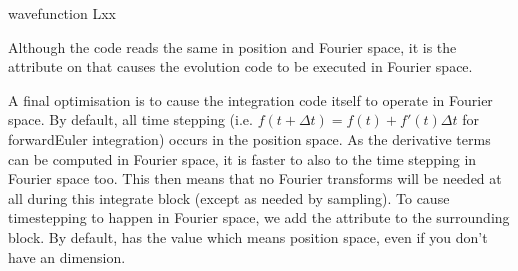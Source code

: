 \documentclass[letterpaper,10pt,english]{sphinxmanual}
\begin{document}
\begin{sphinxVerbatim}[commandchars=\\\{\}]
   wavefunction
     
    Lxx
    \PYG{c+cp}{\PYGZlt{}![CDATA[}
        
    \PYG{c+cp}{]]\PYGZgt{}}
  \PYG{c+cp}{\PYGZlt{}![CDATA[}

      \PYG{p}{[}\PYG{p}{]}  
      \PYG{p}{[}\PYG{p}{]}  

  \PYG{c+cp}{]]\PYGZgt{}}
\end{sphinxVerbatim}

\sphinxAtStartPar
Although the  code reads the same in position and Fourier space, it is the  attribute on  that causes the evolution code to be executed in Fourier space.

\sphinxAtStartPar
A final optimisation is to cause the integration code itself to operate in Fourier space.  By default, all time stepping (i.e. \(f(t + \Delta t) = f(t) + f'(t) \Delta t\) for forward\sphinxhyphen{}Euler integration) occurs in the position space.  As the derivative terms can be computed in Fourier space, it is faster to also to the time stepping in Fourier space too.  This then means that no Fourier transforms will be needed at all during this integrate block (except as needed by sampling).  To cause time\sphinxhyphen{}stepping to happen in Fourier space, we add the  attribute to the surrounding  block.  By default,  has the value  which means position space, even if you don’t have an  dimension.
\end{document}
